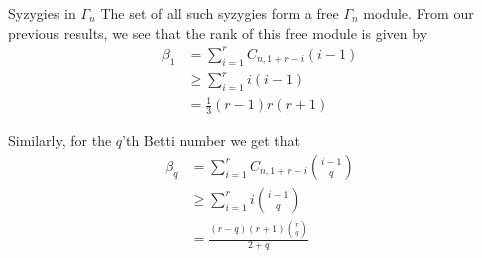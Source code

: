 \begin{section}{Syzygies in \(\Gamma_n\)}
  The set of all such syzygies form a free \(\Gamma_n\) module.
  From our previous results, we see that the rank of this free module
  is given by 
  \begin{align*}
    \beta_1 & = \sum_{i=1}^r C_{n,1+r-i} (i-1) \\
    & \ge \sum_{i=1}^r i (i-1) \\
    & = \frac{1}{3} (r-1)r(r+1)
  \end{align*}
  
  Similarly, for the \(q\)'th Betti number we get that 
  \begin{align*}
    \beta_q & = \sum_{i=1}^r C_{n,1+r-i} \binom{i-1}{q} \\
    & \ge \sum_{i=1}^r i \binom{i-1}{q} \\
    & = {\frac {\left (r-q\right )\left (r+1\right ){r\choose q}}{2+q}}
  \end{align*}

\end{section}